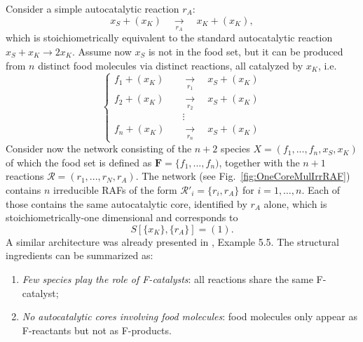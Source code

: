 \documentclass[pdflatex]{sn-jnl}
\theoremstyle{thmstyleone}%
\theoremstyle{examplesty}%
\theoremstyle{thmstylethree}%
\newcommand{\food}{\ensuremath{\mathbf{F}}}
\begin{document}
Consider a simple autocatalytic reaction $r_A$:
\[x_S+(x_K)\quad\underset{r_A}{\longrightarrow}\quad x_K + (x_K), \]
which is stoichiometrically equivalent to the standard autocatalytic reaction $x_S+x_K\rightarrow 2x_K$. Assume now $x_S$ is not 
in the food set, but it can be produced from $n$ distinct food molecules via distinct reactions, all catalyzed by $x_K$, i.e.
\begin{equation}\label{eq:OneCoreMulIrrRAF}
    \begin{cases}
        f_1+(x_K)\quad&\underset{r_1}{\longrightarrow}\quad x_S + (x_K)\\
         f_2+(x_K)\quad&\underset{r_2}{\longrightarrow}\quad x_S + (x_K)\\
         &\vdots \\
         f_n+(x_K)\quad&\underset{r_n}{\longrightarrow}\quad x_S + (x_K)
    \end{cases}
\end{equation}
Consider now the network consisting of the $n+2$ species $X=(f_1,...,f_n,x_S,x_K)$ of which the food set is defined as $\food=\{f_1,...,f_n)$, 
together with the $n+1$ reactions $\mathcal{R}=(r_1,..., r_N, r_A)$. The network (see Fig.~\ref{fig:OneCoreMulIrrRAF}) contains $n$ irreducible 
RAFs of the form $\mathcal{R}'_i=\{r_i,r_A\}$ for $i=1,\ldots,n$. Each of those contains the same autocatalytic core, identified by $r_A$ alone, which is 
stoichiometrically-one dimensional and corresponds to 
\[S[\{x_K\},\{r_A\}]=(1).\]
A similar architecture was already presented in \cite{golnik_bridging_2026}, Example 5.5. The structural ingredients can be summarized as:
\begin{enumerate}
    \item \emph{Few species play the role of F-catalysts}: all reactions share the same F-catalyst;
    \item \emph{No autocatalytic cores involving food molecules}: food molecules only appear as F-reactants but not as F-products.
\end{enumerate}
\end{document}
